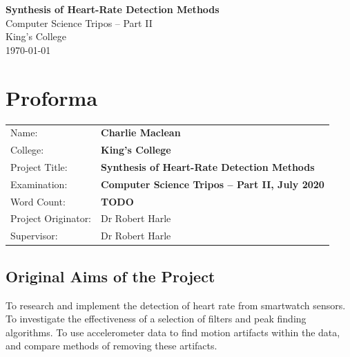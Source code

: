 \documentclass[12pt,a4paper,twoside,openright]{report}
\begin{document}





\pagestyle{empty}


\vspace*{60mm}
\begin{center}
\Huge
\textbf{Synthesis of Heart-Rate Detection Methods} \\[5mm]
Computer Science Tripos -- Part II \\[5mm]
King's College \\[5mm]
\today  %
\end{center}


\pagestyle{plain}

\chapter*{Proforma}

{\large
\begin{tabular}{ll}
Name:               & \bf Charlie Maclean                       \\
College:            & \bf King's College			\\
Project Title:      & \bf Synthesis of Heart-Rate Detection Methods	 \\
Examination:        & \bf Computer Science Tripos -- Part II, July 2020  \\
Word Count:         & \bf TODO\footnotemark[1]		\\
Project Originator: & Dr Robert Harle                   \\
Supervisor:         & Dr Robert Harle                   \\ 
\end{tabular}
}


\section*{Original Aims of the Project}

To research and implement the detection of heart rate from smartwatch 
sensors. To investigate the effectiveness of a selection of filters and 
peak finding algorithms. To use accelerometer data to find motion artifacts
within the data, and compare methods of removing these artifacts.
\end{document}
